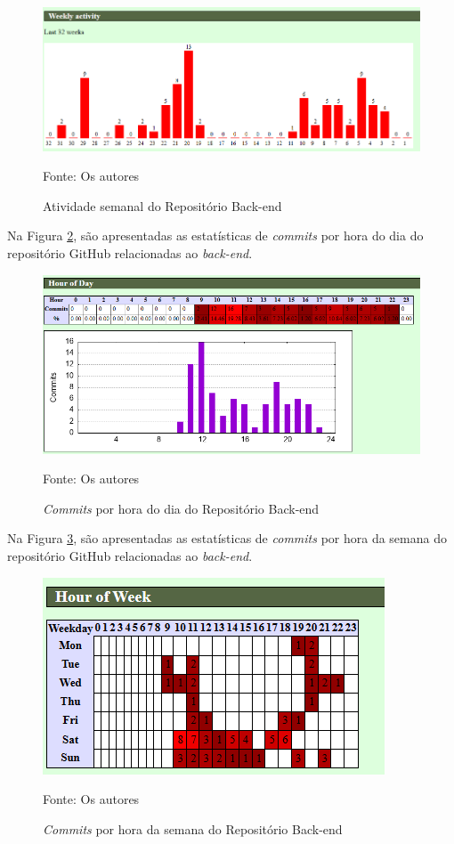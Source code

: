 \begin{apendicesenv}
\begin{figure}[H]
	\centering
	\includegraphics[scale=0.7]{./imagens/metricas/gitStatsBackend/activity/weeklyActivity.png}
	\caption{Atividade semanal do Repositório Back-end}
	Fonte: Os autores
    \label{weeklyActivityBackend}
\end{figure}

Na Figura \ref{hourOfDayBackend}, são apresentadas as estatísticas de \textit{commits} por hora do dia do repositório GitHub relacionadas ao \textit{back-end}.

\begin{figure}[H]
	\centering
	\includegraphics[scale=0.7]{./imagens/metricas/gitStatsBackend/activity/hourOfDay.png}
	\caption{\textit{Commits} por hora do dia do Repositório Back-end}
	Fonte: Os autores
    \label{hourOfDayBackend}
\end{figure}
\pagebreak

Na Figura \ref{hourOfWeekBackend}, são apresentadas as estatísticas de \textit{commits} por hora da semana do repositório GitHub relacionadas ao \textit{back-end}.

\begin{figure}[H]
	\centering
	\includegraphics[scale=1]{./imagens/metricas/gitStatsBackend/activity/hourOfWeek.png}
	\caption{\textit{Commits} por hora da semana do Repositório Back-end}
	Fonte: Os autores
    \label{hourOfWeekBackend}
\end{figure}


\end{apendicesenv}
